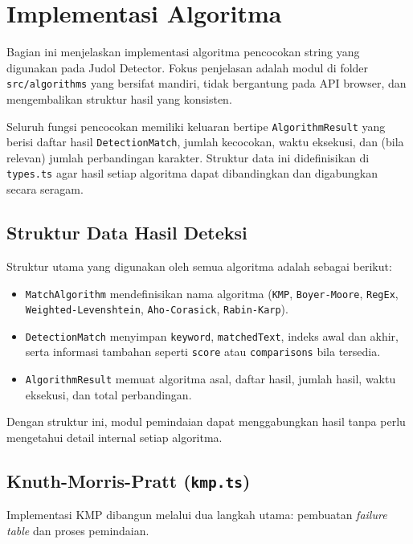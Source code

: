 \section{Implementasi Algoritma}

Bagian ini menjelaskan implementasi algoritma pencocokan string yang
digunakan pada Judol Detector. Fokus penjelasan adalah modul di folder
\texttt{src/algorithms} yang bersifat mandiri, tidak bergantung pada API
browser, dan mengembalikan struktur hasil yang konsisten.

Seluruh fungsi pencocokan memiliki keluaran bertipe
\texttt{AlgorithmResult} yang berisi daftar hasil \texttt{DetectionMatch},
jumlah kecocokan, waktu eksekusi, dan (bila relevan) jumlah perbandingan
karakter. Struktur data ini didefinisikan di \texttt{types.ts} agar hasil
setiap algoritma dapat dibandingkan dan digabungkan secara seragam.

\subsection{Struktur Data Hasil Deteksi}

Struktur utama yang digunakan oleh semua algoritma adalah sebagai berikut:

\begin{itemize}
	\item \texttt{MatchAlgorithm} mendefinisikan nama algoritma
	(\texttt{KMP}, \texttt{Boyer-Moore}, \texttt{RegEx},
	\texttt{Weighted-Levenshtein}, \texttt{Aho-Corasick}, \texttt{Rabin-Karp}).
	\item \texttt{DetectionMatch} menyimpan \texttt{keyword}, \texttt{matchedText},
	indeks awal dan akhir, serta informasi tambahan seperti \texttt{score}
	atau \texttt{comparisons} bila tersedia.
	\item \texttt{AlgorithmResult} memuat algoritma asal, daftar hasil,
	jumlah hasil, waktu eksekusi, dan total perbandingan.
\end{itemize}

Dengan struktur ini, modul pemindaian dapat menggabungkan hasil tanpa perlu
mengetahui detail internal setiap algoritma.

\subsection{Knuth-Morris-Pratt (\texttt{kmp.ts})}

Implementasi KMP dibangun melalui dua langkah utama: pembuatan
\textit{failure table} dan proses pemindaian.

